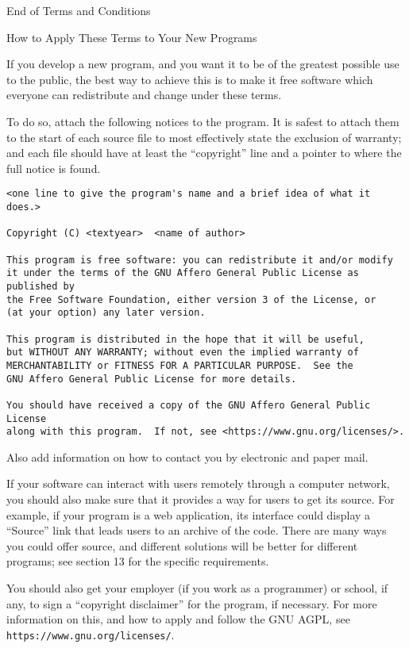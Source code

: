 \documentclass[11pt]{article}
\begin{document}
\begin{enumerate}
          \begin{center}
              {\Large\sc End of Terms and Conditions}

              \bigskip
              How to Apply These Terms to Your New Programs
          \end{center}

          If you develop a new program, and you want it to be of the greatest
          possible use to the public, the best way to achieve this is to make it
          free software which everyone can redistribute and change under these terms.

          To do so, attach the following notices to the program.  It is safest
          to attach them to the start of each source file to most effectively
          state the exclusion of warranty; and each file should have at least
          the ``copyright'' line and a pointer to where the full notice is found.

              {\footnotesize
                  \begin{verbatim}
<one line to give the program's name and a brief idea of what it does.>

Copyright (C) <textyear>  <name of author>

This program is free software: you can redistribute it and/or modify
it under the terms of the GNU Affero General Public License as published by
the Free Software Foundation, either version 3 of the License, or
(at your option) any later version.

This program is distributed in the hope that it will be useful,
but WITHOUT ANY WARRANTY; without even the implied warranty of
MERCHANTABILITY or FITNESS FOR A PARTICULAR PURPOSE.  See the
GNU Affero General Public License for more details.

You should have received a copy of the GNU Affero General Public License
along with this program.  If not, see <https://www.gnu.org/licenses/>.
\end{verbatim}
              }

          Also add information on how to contact you by electronic and paper mail.

          If your software can interact with users remotely through a computer
          network, you should also make sure that it provides a way for users to
          get its source.  For example, if your program is a web application, its
          interface could display a ``Source'' link that leads users to an archive
          of the code.  There are many ways you could offer source, and different
          solutions will be better for different programs; see section 13 for the
          specific requirements.

          You should also get your employer (if you work as a programmer) or
          school, if any, to sign a ``copyright disclaimer'' for the program, if
          necessary.  For more information on this, and how to apply and follow
          the GNU AGPL, see \texttt{https://www.gnu.org/licenses/}.

\end{enumerate}
\end{document}
